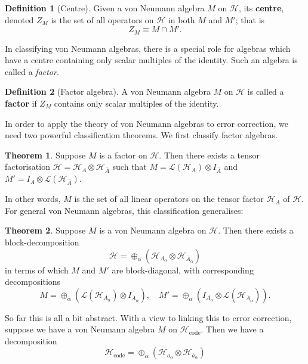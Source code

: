 \documentclass[12pt,a4paper]{report}
\numberwithin{equation}{section}
\newcommand{\Hcode}{\mathcal{H}_{\text{code}}}
\newcommand{\ol}[1]{\overline{#1}}
\theoremstyle{definition}
\newtheorem{definition}{Definition}[section]
\theoremstyle{theorem}
\newtheorem{theorem}{Theorem}[section]
\theoremstyle{theorem}
\theoremstyle{example}
\theoremstyle{definition}
\begin{document}
\begin{definition}[Centre]
	Given a von Neumann algebra $M$ on $\mathcal{H}$, its \textbf{centre}, denoted $Z_{M}$ is the set of all operators on $\mathcal{H}$ in both $M$ and $M'$; that is
	\begin{equation}
		Z_{M}\equiv M\cap M'.
	\end{equation}
\end{definition}
In classifying von Neumann algebras, there is a special role for algebras which have a centre containing only scalar multiples of the identity. Such an algebra is called a \textit{factor}.
\begin{definition}[Factor algebra]
	A von Neumann algebra $M$ on $\mathcal{H}$ is called a \textbf{factor} if $Z_{M}$ contains only scalar multiples of the identity.
\end{definition}
In order to apply the theory of von Neumann algebras to error correction, we need two powerful classification theorems. We first classify factor algebras.
\begin{theorem}
	Suppose $M$ is a factor on $\mathcal{H}$. Then there exists a tensor factorisation $\mathcal{H}=\mathcal{H}_{A}\otimes\mathcal{H}_{\ol{A}}$ such that $M=\mathcal{L}(\mathcal{H}_{A})\otimes I_{\ol{A}}$ and $M'=I_{A}\otimes\mathcal{L}(\mathcal{H}_{\ol{A}})$.
\end{theorem}
In other words, $M$ is the set of all linear operators on the tensor factor $\mathcal{H}_{A}$ of $\mathcal{H}$. For general von Neumann algebras, this classification generalises:
\begin{theorem}
	Suppose $M$ is a von Neumann algebra on $\mathcal{H}$. Then there exists a block-decomposition 
	\begin{equation} 
		\mathcal{H}=\oplus_{\alpha}(\mathcal{H}_{A_{\alpha}}\otimes\mathcal{H}_{\ol{A}_{\alpha}})
	\end{equation}
	in terms of which $M$ and $M'$ are block-diagonal, with corresponding decompositions
	\begin{equation}
		M=\oplus_{\alpha}(\mathcal{L}(\mathcal{H}_{A_{\alpha}})\otimes I_{\ol{A}_{\alpha}}),\quad M'=\oplus_{\alpha}(I_{A_{\alpha}}\otimes\mathcal{L}(\mathcal{H}_{\ol{A}_{\alpha}})).
	\end{equation}
\end{theorem}
So far this is all a bit abstract. With a view to linking this to error correction, suppose we have a von Neumann algebra $M$ on $\Hcode$. Then we have a decomposition
\begin{equation}
	\Hcode=\oplus_{\alpha}(\mathcal{H}_{a_{\alpha}}\otimes\mathcal{H}_{\ol{a}_{\alpha}})
\end{equation} 
\end{document}
